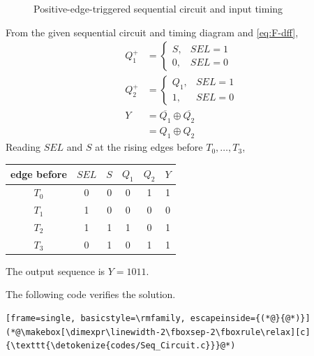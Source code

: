 \begin{enumerate}[label=\thesubsection.\arabic*, ref=\thesubsection.\theenumi]
\begin{figure}[H]
{}
    \caption{Positive-edge-triggered sequential circuit and input timing}
    \label{fig:q45}
\end{figure}

\solution
From the given sequential circuit and timing diagram and \eqref{eq:F-dff},
\begin{align}
Q_1^{+}&=\begin{cases}S,&SEL=1\\0,&SEL=0\end{cases}
\\
Q_2^{+}&=\begin{cases}Q_1,&SEL=1\\1,&SEL=0\end{cases}
\\
Y&=\overline{Q_1}\oplus\overline{Q_2}
\\
&=Q_1\oplus Q_2
\end{align}
Reading $SEL$ and $S$ at the rising edges before $T_0,\dots,T_3$,
\begin{center}
\begin{tabular}{|c|c|c|c|c|c|}
\hline
edge before&$SEL$&$S$&$Q_1$&$Q_2$&$Y$\\
\hline
$T_0$&0&0&0&1&1\\
$T_1$&1&0&0&0&0\\
$T_2$&1&1&1&0&1\\
$T_3$&0&1&0&1&1\\
\hline
\end{tabular}
\end{center}
The output sequence is $Y=1011$.

The following code verifies the solution.
\begin{lstlisting}[frame=single, basicstyle=\rmfamily, escapeinside={(*@}{@*)}]
(*@\makebox[\dimexpr\linewidth-2\fboxsep-2\fboxrule\relax][c]{\texttt{\detokenize{codes/Seq_Circuit.c}}}@*)
\end{lstlisting}


\end{enumerate}
